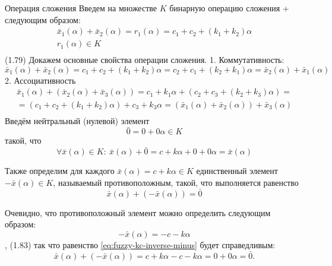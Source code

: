 Операция сложения
Введем на множестве $K$ бинарную операцию сложения + следующим образом:
	\[\begin{matrix}
  {{{\bar{x}}}_{1}}(\alpha )+{{{\bar{x}}}_{2}}(\alpha )={{r}_{1}}\left( \alpha  \right)={{c}_{1}}+{{c}_{2}}+\left( {{k}_{1}}+{{k}_{2}} \right)\alpha  \\ 
  {{r}_{1}}\left( \alpha  \right)\in K \\ 
\end{matrix}\] 	(1.79)
Докажем основные свойства операции сложения.
1. Коммутативность:
\[{{\bar{x}}_{1}}\left( \alpha  \right)+{{\bar{x}}_{2}}\left( \alpha  \right)={{c}_{1}}+{{c}_{2}}+({{k}_{1}}+{{k}_{2}})\alpha ={{c}_{2}}+{{c}_{1}}+({{k}_{2}}+{{k}_{1}})\alpha ={{\bar{x}}_{2}}\left( \alpha  \right)+{{\bar{x}}_{1}}\left( \alpha  \right)\] 
2. Ассоциативность
\[\begin{matrix}
  {{{\bar{x}}}_{1}}\left( \alpha  \right)+\left( {{{\bar{x}}}_{2}}\left( \alpha  \right)+{{{\bar{x}}}_{3}}\left( \alpha  \right) \right)={{c}_{1}}+{{k}_{1}}\alpha +({{c}_{2}}+{{c}_{3}}+({{k}_{2}}+{{k}_{3}})\alpha )= \\ 
  =({{c}_{1}}+{{c}_{2}}+({{k}_{1}}+{{k}_{2}})\alpha )+{{c}_{3}}+{{k}_{3}}\alpha =\left( {{{\bar{x}}}_{1}}\left( \alpha  \right)+{{{\bar{x}}}_{2}}\left( \alpha  \right) \right)+{{{\bar{x}}}_{3}}\left( \alpha  \right) \\ 
\end{matrix}\]
Введём нейтральный (нулевой) элемент
\begin{equation}
\label{eq:fuzzy-kc-zero}
	\bar{0}=0+0\alpha \in K
\end{equation}
такой, что 
\begin{equation}
\label{eq:fuzzy-kc-zeroprop}
	\forall \bar{x}(\alpha )\in K:\ \bar{x}(\alpha )+\bar{0}=c+k\alpha +0+0\alpha =\bar{x}(\alpha )
\end{equation}

Также определим для каждого $\bar{x}\left( \alpha  \right)=c+k\alpha \in K$ единственный элемент $-\bar{x}\left( \alpha  \right)\in K$, называемый противоположным, такой, что выполняется равенство
\begin{equation}
\label{eq:fuzzy-kc-inverse-minus}
	\bar{x}\left( \alpha  \right)+\left( -\bar{x}\left( \alpha  \right) \right)=\bar{0}
\end{equation}

Очевидно, что противоположный элемент можно определить следующим образом:
	\[-\bar{x}\left( \alpha  \right)=-c-k\alpha \], 	(1.83)
так что равенство \eqref{eq:fuzzy-kc-inverse-minus} будет справедливым:
\begin{equation*}
	\bar{x}\left( \alpha  \right)+\left( -\bar{x}\left( \alpha  \right) \right)=c+k\alpha -c-k\alpha =0+0\alpha =\bar{0}.
\end{equation*}

